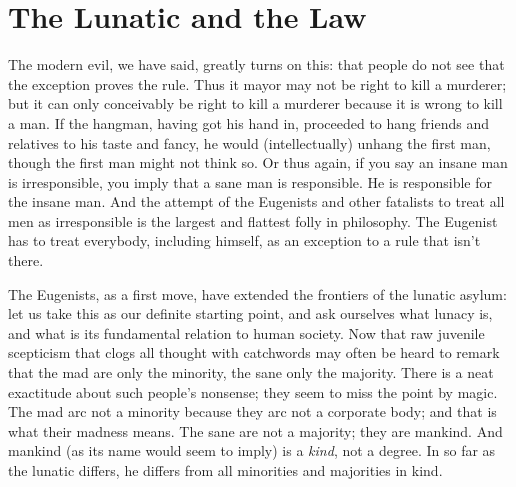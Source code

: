 \documentclass{book}
\begin{document}
\chapter{The Lunatic and the Law}
\label{chapter-5}
The modern evil, we have said, greatly turns on this: that people do not see that the exception proves the rule. Thus it mayor may not be right to kill a murderer; but it can only conceivably be right to kill a murderer because it is wrong to kill a man. If the hangman, having got his hand in, proceeded to hang friends and relatives to his taste and fancy, he would (intellectually) unhang the first man, though the first man might not think so. Or thus again, if you say an insane man is irresponsible, you imply that a sane man is responsible. He is responsible for the insane man. And the attempt of the Eugenists and other fatalists to treat all men as irresponsible is the largest and flattest folly in philosophy. The Eugenist has to treat everybody, including himself, as an exception to a rule that isn’t there.

The Eugenists, as a first move, have extended the frontiers of the lunatic asylum: let us take this as our definite starting point, and ask ourselves what lunacy is, and what is its fundamental relation to human society. Now that raw juvenile scepticism that clogs all thought with catchwords may often be heard to remark that the mad are only the minority, the sane only the majority. There is a neat exactitude about such people’s nonsense; they seem to miss the point by magic. The mad arc not a minority because they arc not a corporate body; and that is what their madness means. The sane are not a majority; they are mankind. And mankind (as its name would seem to imply) is a \emph{kind}, not a degree. In so far as the lunatic differs, he differs from all minorities and majorities in kind.
\end{document}
